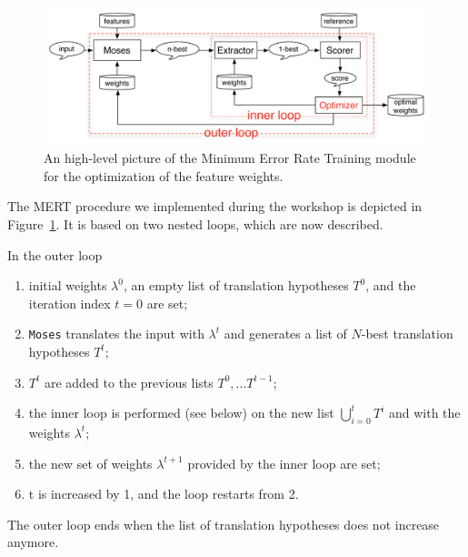 \documentclass[10pt]{report}
\theoremstyle{plain}
\begin{document}
{\begin{figure}
\begin{center}
 \includegraphics[width=\columnwidth]{MER-ext}
\caption{An high-level picture of the Minimum Error Rate Training module for the optimization of the feature weights.}
\label{fig:MERT}
\end{center}
 \end{figure}
 
The MERT procedure we implemented during the workshop is depicted in Figure~\ref{fig:MERT}. 
It is based on two nested loops, which are now described.

In the outer loop 
\begin{enumerate}
\item initial weights $\lambda^0$, an empty list of translation hypotheses $T^0$, and the iteration index $t=0$ are set;
\item {\tt Moses} translates the input with  $\lambda^t$ and generates a list of $N$-best translation hypotheses $T^t$;
\item $T^t$ are added to the previous lists $T^0, \ldots T^{t-1}$;
\item the inner loop is performed (see below) on the new list $\bigcup_{i=0}^{t}T^i$ and with the weights $\lambda^t$;
\item the  new set of weights $\lambda^{t+1}$ provided by the inner loop are set;
\item t is increased by 1, and the loop restarts from 2.
\end{enumerate}
The outer loop ends when the list of translation hypotheses does not increase anymore.

}
\end{document}
